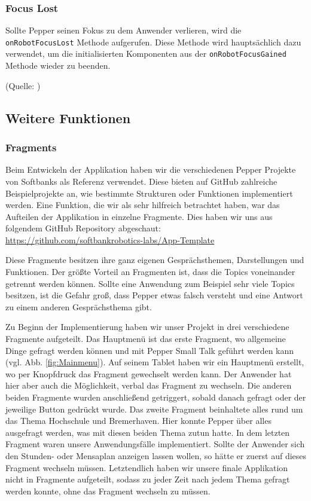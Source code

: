 \subsubsection{Focus Lost} 

Sollte Pepper seinen Fokus zu dem Anwender verlieren, wird die \verb|onRobotFocusLost| Methode aufgerufen. Diese Methode wird hauptsächlich 
dazu verwendet, um die initialisierten Komponenten aus der \verb|onRobotFocusGained| Methode wieder zu beenden. 

(Quelle: \cite{Robot_lifecycle})\\

\subsection{Weitere Funktionen}

\subsubsection{Fragments} 

Beim Entwickeln der Applikation haben wir die verschiedenen Pepper Projekte von Softbanks als Referenz verwendet. Diese bieten auf 
GitHub zahlreiche Beispielprojekte an, wie bestimmte Strukturen oder Funktionen implementiert werden. 
Eine Funktion, die wir als sehr hilfreich betrachtet haben, war das Aufteilen der Applikation in einzelne Fragmente. Dies haben wir uns aus 
folgendem GitHub Repository abgeschaut:\\
\url{https://github.com/softbankrobotics-labs/App-Template}

Diese Fragmente besitzen ihre ganz eigenen Gesprächsthemen, Darstellungen und Funktionen. Der größte Vorteil an Fragmenten ist, dass die Topics 
voneinander getrennt werden können. Sollte eine Anwendung zum Beispiel sehr viele Topics besitzen, ist die Gefahr groß, dass Pepper etwas falsch 
versteht und eine Antwort zu einem anderen Gesprächsthema gibt.

Zu Beginn der Implementierung haben wir unser Projekt in drei verschiedene Fragmente aufgeteilt. Das Hauptmenü ist das erste Fragment, wo 
allgemeine Dinge gefragt werden können und mit Pepper Small Talk geführt werden kann (vgl. Abb. \ref{fig:Mainmenu}). Auf seinem Tablet haben wir ein Hauptmenü erstellt, 
wo per Knopfdruck das Fragment gewechselt werden kann. Der Anwender hat hier aber auch die Möglichkeit, verbal das Fragment zu wechseln.
Die anderen beiden Fragmente wurden anschließend getriggert, sobald danach gefragt oder der jeweilige Button gedrückt wurde. 
Das zweite Fragment beinhaltete alles rund um das Thema Hochschule und Bremerhaven. Hier konnte Pepper über alles ausgefragt werden, was mit 
diesen beiden Thema zutun hatte. In dem letzten Fragment waren unsere Anwendungsfälle implementiert. Sollte der Anwender sich den Stunden- oder 
Mensaplan anzeigen lassen wollen, so hätte er zuerst auf dieses Fragment wechseln müssen. 
Letztendlich haben wir unsere finale Applikation nicht in Fragmente aufgeteilt, sodass zu jeder Zeit nach jedem Thema gefragt werden konnte, 
ohne das Fragment wechseln zu müssen.\\

